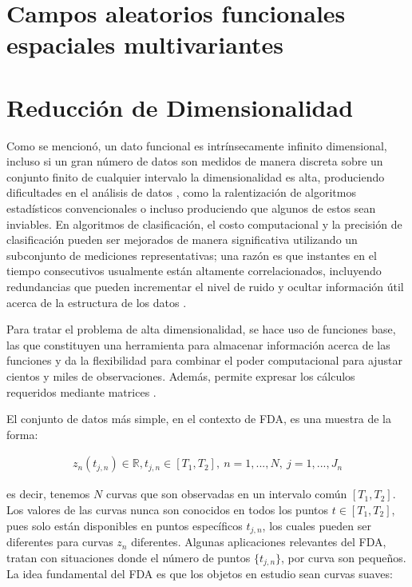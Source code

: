 \documentclass[
]{book}
\begin{document}
\hypertarget{campos-aleatorios-funcionales-espaciales-multivariantes}{%
\section{Campos aleatorios funcionales espaciales multivariantes}\label{campos-aleatorios-funcionales-espaciales-multivariantes}}

\hypertarget{reducciuxf3n-de-dimensionalidad}{%
\section{Reducción de Dimensionalidad}\label{reducciuxf3n-de-dimensionalidad}}

Como se mencionó, un dato funcional es intrínsecamente infinito dimensional, incluso si un gran número de datos son medidos de manera discreta sobre un conjunto finito de cualquier intervalo la dimensionalidad es alta, produciendo dificultades en el análisis de datos \citep{kokoska}, como la ralentización de algoritmos estadísticos convencionales o incluso produciendo que algunos de estos sean inviables. En algoritmos de clasificación, el costo computacional y la precisión de clasificación pueden ser mejorados de manera significativa utilizando un subconjunto de mediciones representativas; una razón es que instantes en el tiempo consecutivos usualmente están altamente correlacionados, incluyendo redundancias que pueden incrementar el nivel de ruido y ocultar información útil acerca de la estructura de los datos \citep{tian}.

Para tratar el problema de alta dimensionalidad, se hace uso de funciones base, las que constituyen una herramienta para almacenar información acerca de las funciones y da la flexibilidad para combinar el poder computacional para ajustar cientos y miles de observaciones. Además, permite expresar los cálculos requeridos mediante matrices \citep{ramsay}.

El conjunto de datos más simple, en el contexto de FDA, es una muestra de la forma:

\begin{align*}
    z_n(t_{j,n})\in\mathbb{R}, t_{j,n}\in [T_1,T_2],\ n=1,...,N,\ j=1,...,J_n
\end{align*}

es decir, tenemos \(N\) curvas que son observadas en un intervalo común \([T_1,T_2]\). Los valores de las curvas nunca son conocidos en todos los puntos \(t\in[T_1,T_2]\), pues solo están disponibles en puntos específicos \(t_{j,n}\), los cuales pueden ser diferentes para curvas \(z_n\) diferentes. Algunas aplicaciones relevantes del FDA, tratan con situaciones donde el número de puntos \(\{t_{j,n}\}\), por curva son pequeños. La idea fundamental del FDA es que los objetos en estudio sean curvas suaves:
\end{document}
